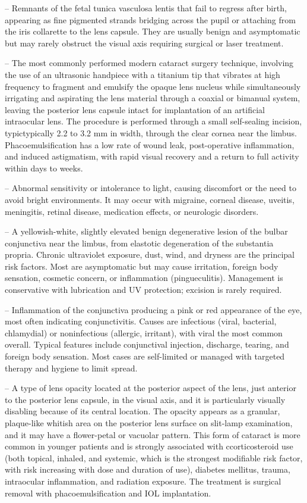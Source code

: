 -- Remnants of the fetal tunica vasculosa lentis that fail to regress after birth, appearing as fine pigmented strands bridging across the pupil or attaching from the iris collarette to the lens capsule. They are usually benign and asymptomatic but may rarely obstruct the visual axis requiring surgical or laser treatment.

-- The most commonly performed modern cataract surgery technique, involving the use of an ultrasonic handpiece with a titanium tip that vibrates at high frequency to fragment and emulsify the opaque lens nucleus while simultaneously irrigating and aspirating the lens material through a coaxial or bimanual system, leaving the posterior lens capsule intact for implantation of an artificial intraocular lens. The procedure is performed through a small self-sealing incision, typictypically 2.2 to 3.2 mm in width, through the clear cornea near the limbus. Phacoemulsification has a low rate of wound leak, post-operative inflammation, and induced astigmatism, with rapid visual recovery and a return to full activity within days to weeks.

-- Abnormal sensitivity or intolerance to light, causing discomfort or the need to avoid bright environments. It may occur with migraine, corneal disease, uveitis, meningitis, retinal disease, medication effects, or neurologic disorders.

-- A yellowish-white, slightly elevated benign degenerative lesion of the bulbar conjunctiva near the limbus, from elastotic degeneration of the substantia propria. Chronic ultraviolet exposure, dust, wind, and dryness are the principal risk factors. Most are asymptomatic but may cause irritation, foreign body sensation, cosmetic concern, or inflammation (pingueculitis). Management is conservative with lubrication and UV protection; excision is rarely required.

-- Inflammation of the conjunctiva producing a pink or red appearance of the eye, most often indicating conjunctivitis. Causes are infectious (viral, bacterial, chlamydial) or noninfectious (allergic, irritant), with viral the most common overall. Typical features include conjunctival injection, discharge, tearing, and foreign body sensation. Most cases are self-limited or managed with targeted therapy and hygiene to limit spread.

-- A type of lens opacity located at the posterior aspect of the lens, just anterior to the posterior lens capsule, in the visual axis, and it is particularly visually disabling because of its central location. The opacity appears as a granular, plaque-like whitish area on the posterior lens surface on slit-lamp examination, and it may have a flower-petal or vacuolar pattern. This form of cataract is more common in younger patients and is strongly associated with ccorticosteroid use (both topical, inhaled, and systemic, which is the strongest modifiable risk factor, with risk increasing with dose and duration of use), diabetes mellitus, trauma, intraocular inflammation, and radiation exposure. The treatment is surgical removal with phacoemulsification and IOL implantation.

